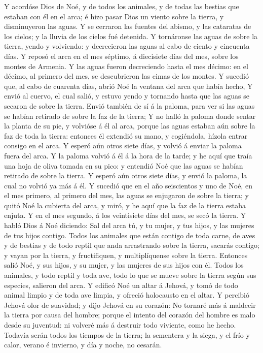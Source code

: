  Y acordóse Dios de Noé, y de todos los animales, y de todas
las bestias que estaban con él en el arca; é hizo pasar Dios un viento
sobre la tierra, y disminuyeron las aguas.  Y se cerraron
las fuentes del abismo, y las cataratas de los cielos; y la lluvia de
los cielos fué detenida.  Y tornáronse las aguas de sobre la
tierra, yendo y volviendo: y decrecieron las aguas al cabo de ciento y
cincuenta días.  Y reposó el arca en el mes séptimo, á
diecisiete días del mes, sobre los montes de Armenia.  Y las
aguas fueron decreciendo hasta el mes décimo: en el décimo, al primero
del mes, se descubrieron las cimas de los montes.  Y sucedió
que, al cabo de cuarenta días, abrió Noé la ventana del arca que había
hecho,  Y envió al cuervo, el cual salió, y estuvo yendo y
tornando hasta que las aguas se secaron de sobre la tierra. 
Envió también de sí á la paloma, para ver si las aguas se habían
retirado de sobre la faz de la tierra;  Y no halló la paloma
donde sentar la planta de su pie, y volvióse á él al arca, porque las
aguas estaban aún sobre la faz de toda la tierra: entonces él extendió
su mano, y cogiéndola, hízola entrar consigo en el arca.  Y
esperó aún otros siete días, y volvió á enviar la paloma fuera del arca.
 Y la paloma volvió á él á la hora de la tarde; y he aquí
que traía una hoja de oliva tomada en su pico: y entendió Noé que las
aguas se habían retirado de sobre la tierra.  Y esperó aún
otros siete días, y envió la paloma, la cual no volvió ya más á él.
 Y sucedió que en el año seiscientos y uno de Noé, en el
mes primero, al primero del mes, las aguas se enjugaron de sobre la
tierra; y quitó Noé la cubierta del arca, y miró, y he aquí que la faz
de la tierra estaba enjuta.  Y en el mes segundo, á los
veintisiete días del mes, se secó la tierra.  Y habló Dios
á Noé diciendo:  Sal del arca tú, y tu mujer, y tus hijos,
y las mujeres de tus hijos contigo.  Todos los animales que
están contigo de toda carne, de aves y de bestias y de todo reptil que
anda arrastrando sobre la tierra, sacarás contigo; y vayan por la
tierra, y fructifiquen, y multiplíquense sobre la tierra. 
Entonces salió Noé, y sus hijos, y su mujer, y las mujeres de sus hijos
con él.  Todos los animales, y todo reptil y toda ave, todo
lo que se mueve sobre la tierra según sus especies, salieron del arca.
 Y edificó Noé un altar á Jehová, y tomó de todo animal
limpio y de toda ave limpia, y ofreció holocausto en el altar.
 Y percibió Jehová olor de suavidad; y dijo Jehová en su
corazón: No tornaré más á maldecir la tierra por causa del hombre;
porque el intento del corazón del hombre es malo desde su juventud: ni
volveré más á destruir todo viviente, como he hecho. 
Todavía serán todos los tiempos de la tierra; la sementera y la siega, y
el frío y calor, verano é invierno, y día y noche, no cesarán.


